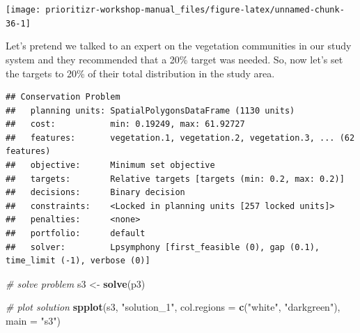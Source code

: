 \documentclass[12pt,]{book}
\newenvironment{Shaded}{\begin{snugshade}}{\end{snugshade}}
\newcommand{\KeywordTok}[1]{\textcolor[rgb]{0.13,0.29,0.53}{\textbf{#1}}}
\newcommand{\DataTypeTok}[1]{\textcolor[rgb]{0.13,0.29,0.53}{#1}}
\newcommand{\FloatTok}[1]{\textcolor[rgb]{0.00,0.00,0.81}{#1}}
\newcommand{\StringTok}[1]{\textcolor[rgb]{0.31,0.60,0.02}{#1}}
\newcommand{\CommentTok}[1]{\textcolor[rgb]{0.56,0.35,0.01}{\textit{#1}}}
\newcommand{\OtherTok}[1]{\textcolor[rgb]{0.56,0.35,0.01}{#1}}
\newcommand{\OperatorTok}[1]{\textcolor[rgb]{0.81,0.36,0.00}{\textbf{#1}}}
\newcommand{\NormalTok}[1]{#1}
\begin{document}
\begin{center}\texttt{[image: prioritizr-workshop-manual\_files/figure-latex/unnamed-chunk-36-1]} \end{center}

Let's pretend we talked to an expert on the vegetation communities in
our study system and they recommended that a 20\% target was needed. So,
now let's set the targets to 20\% of their total distribution in the
study area.

\begin{Shaded}
\end{Shaded}

\begin{verbatim}
## Conservation Problem
##   planning units: SpatialPolygonsDataFrame (1130 units)
##   cost:           min: 0.19249, max: 61.92727
##   features:       vegetation.1, vegetation.2, vegetation.3, ... (62 features)
##   objective:      Minimum set objective 
##   targets:        Relative targets [targets (min: 0.2, max: 0.2)]
##   decisions:      Binary decision 
##   constraints:    <Locked in planning units [257 locked units]>
##   penalties:      <none>
##   portfolio:      default
##   solver:         Lpsymphony [first_feasible (0), gap (0.1), time_limit (-1), verbose (0)]
\end{verbatim}

\begin{Shaded}
\begin{Highlighting}[]
\CommentTok{# solve problem}
\NormalTok{s3 <-}\StringTok{ }\KeywordTok{solve}\NormalTok{(p3)}

\CommentTok{# plot solution}
\KeywordTok{spplot}\NormalTok{(s3, }\StringTok{"solution_1"}\NormalTok{, }\DataTypeTok{col.regions =} \KeywordTok{c}\NormalTok{(}\StringTok{"white"}\NormalTok{, }\StringTok{"darkgreen"}\NormalTok{), }\DataTypeTok{main =} \StringTok{"s3"}\NormalTok{)}
\end{Highlighting}
\end{Shaded}
\end{document}
